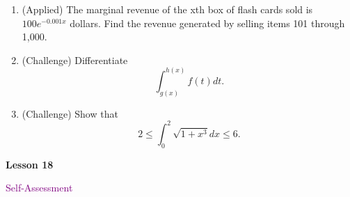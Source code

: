 \documentclass[10pt]{book}
\theoremstyle{definition}
\theoremstyle{remark}
\begin{document}
\begin{large}
\begin{enumerate}
\item (Applied) The marginal revenue of the xth box of flash cards sold is $100e^{-0.001x}$ dollars. Find the revenue generated by selling items 101 through 1,000.\vfil\vfil
\item (Challenge) Differentiate \[\int_{g(x)}^{h(x)} f(t) dt.\]\vfil\vfil
\item (Challenge) Show that \[2 \leq \int_{0}^2 \sqrt{1 + x^3} dx \leq 6.\]\vfil
\end{enumerate}
\end{large}
\newpage


\begin{tcolorbox}[
  width=\textwidth,
  colback=gray!10, %
  colframe=white, %
  boxrule=0pt,    %
  left=1cm,       %
  right=1cm,      %
  sharp corners  %
]

\begin{minipage}[t]{0.5\textwidth}
  \Huge \textbf{Lesson 18}
\end{minipage}%
\hfill
\begin{minipage}[t]{0.5\textwidth}
  \Huge\textcolor{purple}{Self-Assessment}
\end{minipage}
\end{tcolorbox}
\end{document}
